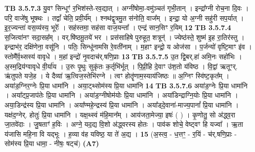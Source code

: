 \documentclass[17pt]{extarticle}
\begin{document}
{{{{{{{{{{{{{{{{{{{                  \newline
                                \textbf{ TB 3.5.7.3} \newline
                  यु॒वꣳ सिन्धूꣳ॑ र॒भिश॑स्ते-रव॒द्यात् । अग्नी॑षोमा॒-वमु॑ञ्चतं गृभी॒तान् । इन्द्रा᳚ग्नी रोच॒ना दि॒वः । परि॒ वाजे॑षु भूषथः । तद्वां᳚ चेति॒ प्रवी॒र्य᳚म् । श्नथ॑द्वृ॒त्रमु॒त स॑नोति॒ वाज᳚म् । इन्द्रा॒ यो अ॒ग्नी सहु॑री सप॒र्यात् । इ॒र॒ज्यन्ता॑ वस॒व्य॑स्य॒ भूरेः᳚ । सह॑स्तमा॒ सह॑सा वाज॒यन्ता᳚ । एन्द्र॑ सान॒सिꣳ र॒यिम् \textbf{ 12} \newline
                  \newline
                                \textbf{ TB 3.5.7.4} \newline
                  स॒जित्वा॑नꣳ सदा॒सह᳚म् । वर्.षि॑ष्ठमू॒तये॑ भर । प्रस॑साहिषे पुरुहूत॒ शत्रून्॑ । ज्येष्ठ॑स्ते॒ शुष्म॑ इ॒ह रा॒तिर॑स्तु । इन्द्राभ॑र॒ दक्षि॑णेना॒ वसू॑नि । पतिः॒ सिन्धू॑नामसि रे॒वती॑नाम् । म॒हाꣳ इन्द्रो॒ य ओज॑सा । प॒र्जन्यो॑ वृष्टि॒माꣳ इ॑व । स्तोमै᳚र्व॒थ्सस्य॑ वावृधे । म॒हां इन्द्रो॑ नृ॒वदाच॑र्.षणि॒प्राः \textbf{ 13} \newline
                  \newline
                                \textbf{ TB 3.5.7.5} \newline
                  उ॒त द्वि॒बर्.हा॑ अमि॒नः सहो॑भिः । अ॒स्म॒द्रिय॑ग्वावृधे वी॒र्या॑य । उ॒रुः पृ॒थुः सुकृ॑तः क॒र्तृभि॑र्भूत् । पि॒प्री॒हि दे॒वाꣳ उ॑श॒तो य॑विष्ठ । वि॒द्वां ऋतूꣳर्. ऋ॑तुपते यजे॒ह । ये दैव्या॑ ऋ॒त्विज॒स्तेभि॑रग्ने । त्वꣳ होतॄ॑णाम॒स्याय॑जिष्ठः ॥ अ॒ग्निꣳ स्वि॑ष्ट॒कृत᳚म् । अया॑ड॒ग्निर॒ग्नेः प्रि॒या धामा॑नि । अया॒ट्थ्सोम॑स्य प्रि॒या धामा॑नि \textbf{ 14} \newline
                  \newline
                                \textbf{ TB 3.5.7.6} \newline
                  अया॑ड॒ग्नेः प्रि॒या धामा॑नि । अया᳚ट्प्र॒जाप॑तेः प्रि॒या धामा॑नि । अया॑ड॒ग्नीषोम॑योः प्रि॒या धामा॑नि । अया॑डिन्द्राग्नि॒योः प्रि॒या धामा॑नि । अया॒डिन्द्र॑स्य प्रि॒या धामा॑नि । अया᳚ण्महे॒न्द्रस्य॑ प्रि॒या धामा॑नि । अया᳚ड्दे॒वाना॑-माज्य॒पानां᳚ प्रि॒या धामा॑नि । यक्ष॑द॒ग्नेर्. होतुः॑ प्रि॒या धामा॑नि । यक्ष॒थ्स्वं म॑हि॒मान᳚म् । आय॑जता॒मेज्या॒ इषः॑ ( ) । कृ॒णोतु॒ सो अ॑द्ध्व॒रा जा॒तवे॑दाः । जु॒षताꣳ॑ ह॒विः । अग्ने॒ यद॒द्य वि॒शो अ॑द्ध्वरस्य होतः । पाव॑क शोचे॒ वेष्ट्वꣳ हि यज्वा᳚ । ऋ॒ता य॑जासि महि॒ना वि यद्भूः । ह॒व्या व॑ह यविष्ठ॒ या ते॑ अ॒द्य । \textbf{ 15} \newline
                  \newline
                                    (अ॒स्त्व॒ - ध॒त्तꣳ॒ - र॒यिं - च॑र्.षणि॒प्राः - सोम॑स्य प्रि॒या धामा॒ - नीषः॒ षट्च॑) \textbf{(A7)} \newline \newline
}}}}}}}}}}}}}}}}}}}
\end{document}
